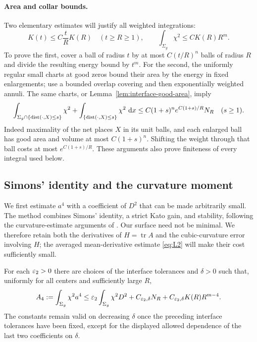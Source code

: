 \paragraph{Area and collar bounds.}
Two elementary estimates will justify all weighted integrations:
\begin{equation}\label{eq:growth-area}
 K(t)\le C\frac tR K(R)\quad(t\ge R\ge1),\qquad
 \int_{\Sigma_g}\chi^2\le CK(R)R^m.
\end{equation}
To prove the first, cover a ball of radius $t$ by at most
$C(t/R)^n$ balls of radius $R$ and divide the resulting energy bound by
$t^m$.  For the second, the uniformly regular small charts at good zeros
bound their area by the energy in fixed enlargements; use a bounded
overlap covering and then exponentially weighted annuli.  The same
charts, or Lemma~\ref{lem:interface-good-area}, imply
\begin{equation}\label{eq:growth-collar-count}
 \int_{\Sigma_g\cap\{\operatorname{dist}(\cdot,X)\le s\}}\chi^2
 +\int_{\{\operatorname{dist}(\cdot,X)\le s\}}\chi^2\,\,\mathrm d x
 \le C(1+s)^n e^{C(1+s)/R}N_R\quad(s\ge1).
\end{equation}
Indeed maximality of the net places $X$ in its unit balls, and each
enlarged ball has good area and volume at most $C(1+s)^n$.  Shifting the
weight through that ball costs at most $e^{C(1+s)/R}$.  These arguments
also prove finiteness of every integral used below.

\subsection{Simons' identity and the curvature moment}

We first estimate $a^4$ with a coefficient of $D^2$ that can be made
arbitrarily small.  The method combines Simons' identity, a strict Kato
gain, and stability, following the curvature-estimate arguments of
\citet{Simons1968,SchoenSimonYau1975}.  Our surface need not be minimal.
We therefore retain both the derivatives of $H=\operatorname{tr}A$ and
the cubic-curvature error involving $H$; the averaged mean-derivative
estimate \eqref{eq:L2} will make their cost sufficiently small.

\begin{lemma}
\label{lem:growth-curvature}
For each $\varepsilon_2>0$ there are choices of the interface tolerances and
$\delta>0$ such that, uniformly for all centers and sufficiently large
$R$,
\begin{equation}\label{eq:M2}
 A_4:=\int_{\Sigma_g}\chi^2a^4
 \le\varepsilon_2\int_{\Sigma_g}\chi^2D^2
       +C_{\varepsilon_2,\delta}N_R
       +C_{\varepsilon_2,\delta}K(R)R^{m-4}.
\end{equation}
The constants remain valid on decreasing $\delta$ once the preceding
interface tolerances have been fixed, except for the displayed allowed
dependence of the last two coefficients on $\delta$.
\end{lemma}

